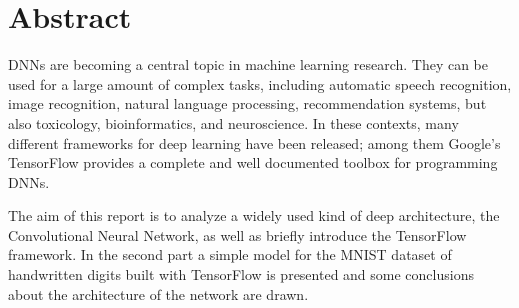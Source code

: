 \begingroup
\let\clearpage\relax
\let\cleardoublepage\relax
\let\cleardoublepage\relax

\chapter*{Abstract}
\acp{DNN} are becoming a central topic in machine learning research. They can be used for a large amount of complex tasks, including automatic speech recognition, image recognition, natural language processing, recommendation systems, but also toxicology, bioinformatics, and neuroscience. In these contexts, many different frameworks for deep learning have been released; among them Google's TensorFlow provides a complete and well documented toolbox for programming \acp{DNN}.

The aim of this report is to analyze a widely used kind of deep architecture, the Convolutional Neural Network, as well as briefly introduce the TensorFlow framework. In the second part a simple model for the \acs{MNIST} dataset of handwritten digits built with TensorFlow is presented and some conclusions about the architecture of the network are drawn.

\endgroup			

\vfill